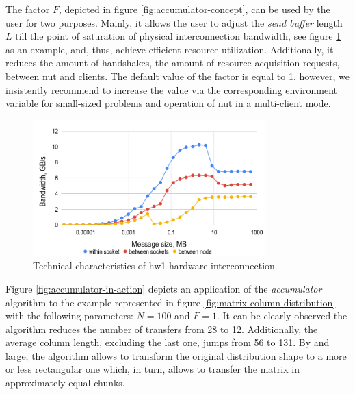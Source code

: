 The factor $F$, depicted in figure \ref{fig:accumulator-concept}, can be used by the user for two purposes. Mainly, it allows the user to adjust the \textit{send buffer} length $L$ till the point of saturation of physical interconnection bandwidth, see figure \ref{fig:hw1-bandwidth} as an example, and, thus, achieve efficient resource utilization. Additionally, it reduces the amount of handshakes, the amount of resource acquisition requests, between \acrshort{nut} and clients. The default value of the factor is equal to 1, however, we insistently recommend to increase the value via the corresponding environment variable for small-sized problems and operation of \acrshort{nut} in a multi-client mode.\\


\begin{figure}[htpb]
  \centering
  \includegraphics[width=0.8\textwidth]{figures/chapter-3/hw1-bandwidth.png}
  \caption{Technical characteristics of  \gls{hw1} hardware interconnection} \label{fig:hw1-bandwidth}
\end{figure}



Figure \ref{fig:accumulator-in-action} depicts an application of the \textit{accumulator} algorithm to the example represented in figure \ref{fig:matrix-column-distribution} with the following parameters: $N = 100$ and $F = 1$. It can be clearly observed the algorithm reduces the number of transfers from 28 to 12. Additionally, the average column length, excluding the last one, jumps from 56 to 131. By and large, the algorithm allows to transform the original distribution shape to a more or less rectangular one which, in turn, allows to transfer the matrix in approximately equal chunks.\\



